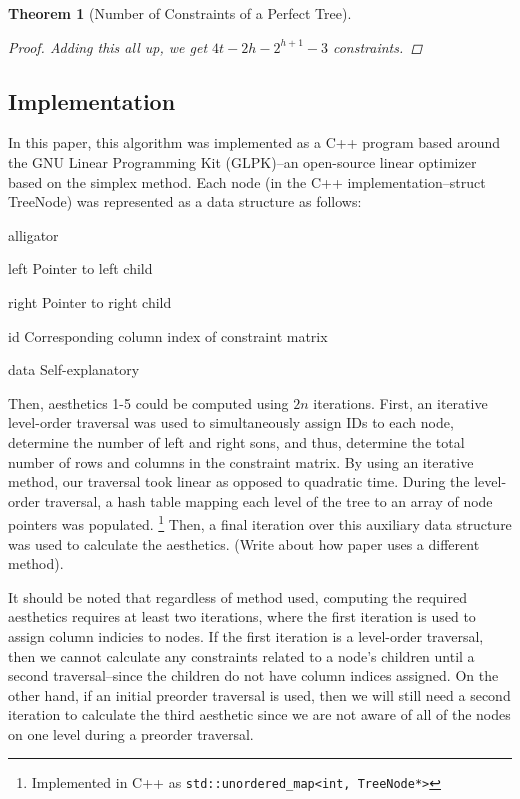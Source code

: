 \documentclass[11pt]{report}
\newtheorem{theorem}{Theorem}[section]
\begin{document}
\begin{theorem}[Number of Constraints of a Perfect Tree]
\begin{proof}
        \bigskip
        
        Adding this all up, we get $4t - 2h - 2^{h+1} - 3$ constraints.
    \end{proof}
\end{theorem}

\subsection{Implementation}
In this paper, this algorithm was implemented as a C++ program based around the GNU Linear Programming Kit (GLPK)--an open-source linear optimizer based on the simplex method.\cite{glpk} Each node (in the C++ implementation--struct TreeNode) was represented as a data structure as follows:

\begin{labeling}{alligator}
    \item [left]  Pointer to left child
    \item [right] Pointer to right child
    \item [id]    Corresponding column index of constraint matrix
    \item [data]  Self-explanatory
\end{labeling}

Then, aesthetics 1-5 could be computed using $2n$ iterations. First, an iterative level-order traversal was used to simultaneously assign IDs to each node, determine the number of left and right sons, and thus, determine the total number of rows and columns in the constraint matrix. By using an iterative method, our traversal took linear as opposed to quadratic time. During the level-order traversal, a hash table mapping each level of the tree to an array of node pointers was populated.
\footnote{Implemented in C++ as \lstinline{std::unordered_map<int, TreeNode*>}}
Then, a final iteration over this auxiliary data structure was used to calculate the aesthetics. (Write about how paper uses a different method).

\bigskip

It should be noted that regardless of method used, computing the required aesthetics requires at least two iterations, where the first iteration is used to assign column indicies to nodes. If the first iteration is a level-order traversal, then we cannot calculate any constraints related to a node's children until a second traversal--since the children do not have column indices assigned. On the other hand, if an initial preorder traversal is used, then we will still need a second iteration to calculate the third aesthetic since we are not aware of all of the nodes on one level during a preorder traversal.
\end{document}
